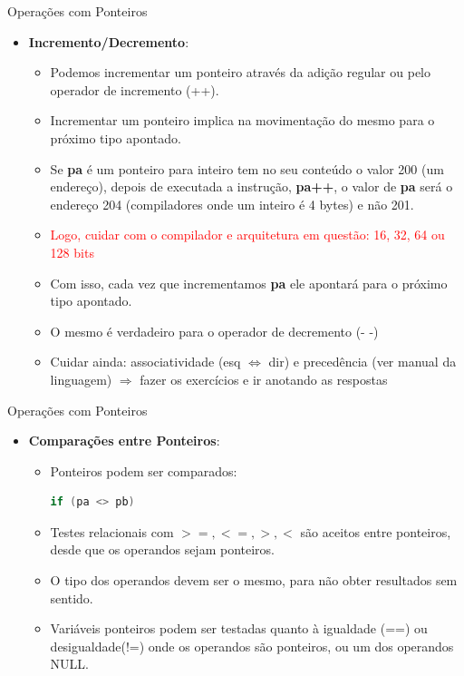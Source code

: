 \begin{frame}[fragile,c]{Operações com Ponteiros}  
  \begin{itemize}[<+->]
    \item \textbf{Incremento/Decremento}:
    \begin{itemize}[<+->]
      \item Podemos incrementar um ponteiro através da adição regular ou pelo operador de incremento (++).
      \item Incrementar um ponteiro implica na movimentação do mesmo para o próximo tipo apontado.
     
      \item Se \textbf{pa} é um ponteiro para inteiro tem no seu conteúdo o valor 200 (um endereço), depois de executada a instrução, \textbf{pa++}, o valor de \textbf{pa} será o endereço 204 (compiladores onde um inteiro é 4 bytes) e não 201.
     
      \item \textcolor{red}{Logo, cuidar com o compilador e arquitetura em questão: 16, 32, 64 ou 128 bits}
    
      \item Com isso, cada vez que incrementamos \textbf{pa} ele apontará para o próximo tipo apontado.
      \item O mesmo é verdadeiro para o operador de decremento (- -)
      \item Cuidar ainda: associatividade  (esq $\Leftrightarrow$ dir) e precedência (ver manual da linguagem) $\Rightarrow$ fazer os exercícios e ir anotando as respostas
    \end{itemize}
  \end{itemize}
\end{frame}

\begin{frame}[fragile,c]{Operações com Ponteiros}  
  \begin{itemize}[<+->]
    \item \textbf{Comparações entre Ponteiros}:
    \begin{itemize}[<+->]
      \item Ponteiros podem ser comparados:
\begin{lstlisting}[language=C]
  if (pa <> pb)
\end{lstlisting}
      \item Testes relacionais com $>=, <=, >, <$ são aceitos entre ponteiros, desde que os operandos sejam ponteiros.
      \item \alert{O tipo dos operandos devem ser o mesmo, para não obter resultados sem sentido}.
      \item Variáveis ponteiros podem ser testadas quanto à igualdade (==) ou desigualdade(!=) onde os operandos são ponteiros, ou um dos operandos NULL.
    \end{itemize}
  \end{itemize}
\end{frame}

